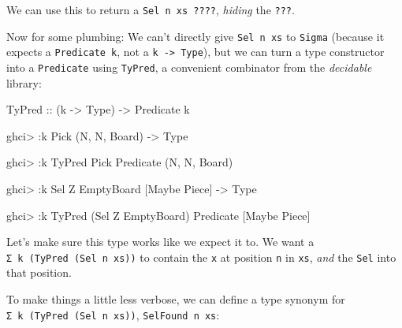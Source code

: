 \documentclass[]{article}
\newenvironment{Shaded}{}{}
\newcommand{\DataTypeTok}[1]{\textcolor[rgb]{0.56,0.13,0.00}{#1}}
\newcommand{\NormalTok}[1]{#1}
\newcommand{\OperatorTok}[1]{\textcolor[rgb]{0.40,0.40,0.40}{#1}}
\newcommand{\OtherTok}[1]{\textcolor[rgb]{0.00,0.44,0.13}{#1}}
\begin{document}
We can use this to return a \texttt{Sel\ n\ xs\ ????}, \emph{hiding} the
\texttt{???}.

Now for some plumbing: We can't directly give \texttt{Sel\ n\ xs} to
\texttt{Sigma} (because it expects a \texttt{Predicate\ k}, not a
\texttt{k\ -\textgreater{}\ Type}), but we can turn a type constructor into a
\texttt{Predicate} using \texttt{TyPred}, a convenient combinator from the
\emph{decidable} library:

\begin{Shaded}
\begin{Highlighting}[]
\DataTypeTok{TyPred}\OtherTok{ ::}\NormalTok{ (k }\OtherTok{{-}>} \DataTypeTok{Type}\NormalTok{) }\OtherTok{{-}>} \DataTypeTok{Predicate}\NormalTok{ k}
\end{Highlighting}
\end{Shaded}

\begin{Shaded}
\begin{Highlighting}[]
\NormalTok{ghci}\OperatorTok{>} \OperatorTok{:}\NormalTok{k }\DataTypeTok{Pick}
\NormalTok{(}\DataTypeTok{N}\NormalTok{, }\DataTypeTok{N}\NormalTok{, }\DataTypeTok{Board}\NormalTok{) }\OtherTok{{-}>} \DataTypeTok{Type}

\NormalTok{ghci}\OperatorTok{>} \OperatorTok{:}\NormalTok{k }\DataTypeTok{TyPred} \DataTypeTok{Pick}
\DataTypeTok{Predicate}\NormalTok{ (}\DataTypeTok{N}\NormalTok{, }\DataTypeTok{N}\NormalTok{, }\DataTypeTok{Board}\NormalTok{)}

\NormalTok{ghci}\OperatorTok{>} \OperatorTok{:}\NormalTok{k }\DataTypeTok{Sel} \DataTypeTok{\textquotesingle{}Z} \DataTypeTok{EmptyBoard}
\NormalTok{[}\DataTypeTok{Maybe} \DataTypeTok{Piece}\NormalTok{] }\OtherTok{{-}>} \DataTypeTok{Type}

\NormalTok{ghci}\OperatorTok{>} \OperatorTok{:}\NormalTok{k }\DataTypeTok{TyPred}\NormalTok{ (}\DataTypeTok{Sel} \DataTypeTok{\textquotesingle{}Z} \DataTypeTok{EmptyBoard}\NormalTok{)}
\DataTypeTok{Predicate}\NormalTok{ [}\DataTypeTok{Maybe} \DataTypeTok{Piece}\NormalTok{]}
\end{Highlighting}
\end{Shaded}

Let's make sure this type works like we expect it to. We want a
\texttt{Σ\ k\ (TyPred\ (Sel\ n\ xs))} to contain the \texttt{x} at position
\texttt{n} in \texttt{xs}, \emph{and} the \texttt{Sel} into that position.

To make things a little less verbose, we can define a type synonym for
\texttt{Σ\ k\ (TyPred\ (Sel\ n\ xs))}, \texttt{SelFound\ n\ xs}:
\end{document}
